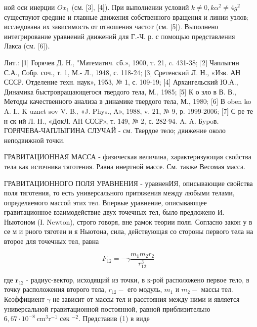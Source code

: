 \documentclass[10pt]{article}
\begin{document}
ной оси инерции $O x_{1}$ (см. [3], [4]). При выполнении условий $k \neq 0, k \alpha^{2} \neq 4 g^{2}$ существуют средние и главные движения собственного вращения и линии узлов; исследована их зависимость от отношения частот (см. [5]). Выполнено интегрирование уравнений движений для Г.-Ч. р. с помощью представления Лакса (см. [6]).



Лит.: [1] Горячев Д. Н., "Математич. сб.», 1900, т. 21, c. 431-38; [2] Чаплыгин С.А., Собр. соч., т. 1, М.- Л., 1948, с. 118-24; [3] Сретенский Л. Н., «Изв. АН СССР. Отделение техн. наук», 1953, № 1, с. 109-19; [4] Архангельский Ю.А., Динамика быстровращающегося твердого тела, М., 1985; [5] К о зло в В. В., Методы качественного анализа в динамике твердого тела, М., 1980; [6] В oben ko A. I., K uznet sov V. B., «J. Phys., A», 1988, v. 21, № 9, р. 1999-2006; [7] С ре те н ск ий Л. Н., «ДокЛ. АН СССР», т. 149, № 2, с. 282-94. A. A. Бypoв. ГОРЯЧЕВА-ЧАПЛЫГИНА СЛУЧАЙ - см. Твердое тело; движение около неподвижной точки.



ГРАВИТАЦИОННАЯ МАССА - физическая величина, характеризующая свойства тела как источника тяготения. Равна инертной массе. См. также Весомая масса.



ГРАВИТАЦИОННОГО ПОЛЯ УРАВНЕНИЯ - уравненИЯ, описывающие свойства поля тяготения, то есть универсального притяжения между любыми телами, определяемого массой этих тел. Впервые уравнение, описывающее гравитационное взаимодействие двух точечных тел, было предложено И. Ньютоном (I. Newton), строго говоря, вне рамок теории поля. Согласно закон у в се м и рного тяготен и я Ньютона, сила, действующая со стороны первого тела на второе для точечных тел, равна



\[

F_{12}=-\gamma \frac{m_{1} m_{2} r_{2}}{r_{12}^{3}}

\]



где $\boldsymbol{r}_{12}$ - радиус-вектор, исходящий из точки, в к-рой расположено первое тело, в точку расположения второго тела, $r_{12}-$ его модуль, $m_{1}$ и $m_{2}-$ массы тел. Коэффициент $\gamma$ не зависит от массы тел и расстояния между ними и является универсальной гравитационной постоянной, равной приблизительно $6,67 \cdot 10^{-8} \mathrm{~cm}^{3} \mathrm{r}^{-1}$ сек $^{-2}$. Представив (1) в виде
\end{document}
